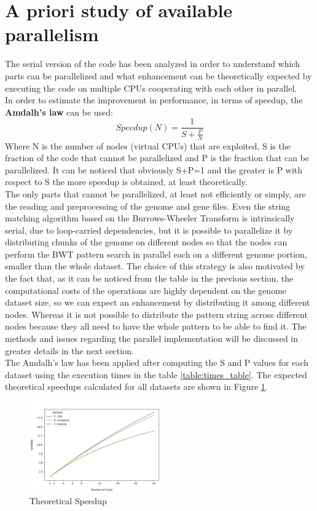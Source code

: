 \documentclass[final,5p,times,twocolumn,authoryear]{elsarticle}
\begin{document}
\section{A priori study of available parallelism}
The serial version of the code has been analyzed in order to understand which parts can be parallelized and what enhancement can be theoretically expected by executing the code on multiple CPUs cooperating with each other in parallel.\\
In order to estimate the improvement in performance, in terms of speedup, the \textbf{Amdalh's law} can be used:
$$ Speedup(N) = \frac{1}{S + \frac{P}{N}} $$
Where N is the number of nodes (virtual CPUs) that are exploited, S is the fraction of the code that cannot be parallelized and P is the fraction that can be parallelized. It can be noticed that obviously S+P=1 and the greater is P with respect to S the more speedup is obtained, at least theoretically.\\
The only parts that cannot be parallelized, at least not efficiently or simply, are the reading and preprocessing of the genome and gene files. Even the string matching algorithm based on the Burrows-Wheeler Transform is intrinsically serial, due to loop-carried dependencies, but it is possible to parallelize it by distributing chunks of the genome on different nodes so that the nodes can perform the BWT pattern search in parallel each on a different genome portion, smaller than the whole dataset. The choice of this strategy is also motivated by the fact that, as it can be noticed from the table in the previous section, the computational costs of the operations are highly dependent on the genome dataset size, so we can expect an enhancement by distributing it among different nodes. Whereas it is not possible to distribute the pattern string across different nodes because they all need to have the whole pattern to be able to find it. The methods and issues regarding the parallel implementation will be discussed in greater details in the next section. \\
The Amdalh's law has been applied after computing the S and P values for each dataset using the execution times in the table \ref{table:times_table}. The expected theoretical speedups calculated for all datasets are shown in Figure \ref{fig:theoretical-speedup-label}.
\begin{figure}[H]
    \centering
    \includegraphics[width=0.5\textwidth]{images/theoretical_speedup.png}
    \caption{Theoretical Speedup}
    \label{fig:theoretical-speedup-label}
\end{figure}
\end{document}
